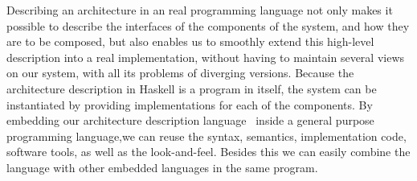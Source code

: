 \documentclass{llncs}
\newcommand{\sds}[1]{{\textcolor{blue}\small\marginpar{#1}}}
\begin{document}
Describing an architecture in an real programming language not only makes it possible to describe the interfaces of the components of the system, and how they are to be composed, but also enables us to smoothly extend this high-level description into a real implementation, without having to maintain several views on our system, with all its problems of diverging versions. Because the architecture description in Haskell is a program in itself, the system can be instantiated by providing implementations for each of the components. By embedding our architecture description language~\cite{hudak98DSLs} inside a general purpose programming language,we can reuse the syntax, semantics, implementation code, software tools, as well as the look-and-feel. Besides this we can easily combine the language with other embedded languages in the same program.

\sds{add summary}
			
			
			
\end{document}
